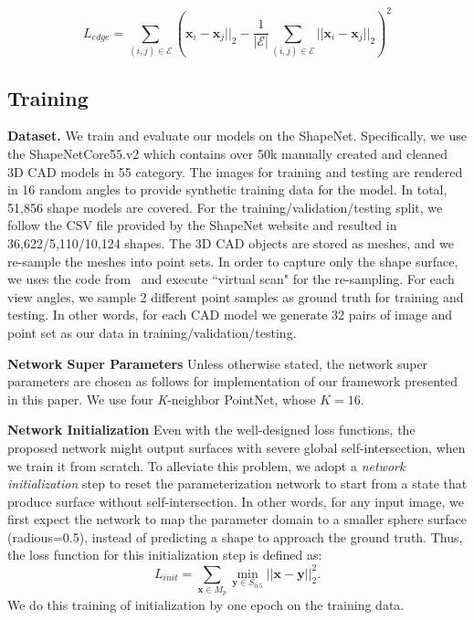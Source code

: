 \begin{equation}
\label{equ:edgereg}
L_{edge} = \sum_{(i,j)\in\mathcal{E}}(\mathbf{x}_i-\mathbf{x}_j||_2 - \frac{1}{|\mathcal{E}|}\sum_{(i,j)\in\mathcal{E} }||\mathbf{x}_i-\mathbf{x}_j||_2)^2
\end{equation}



\subsection{Training} 
\noindent \textbf{Dataset.}
We train and evaluate our models on the ShapeNet\cite{shapenetdata}. Specifically, we use the ShapeNetCore55.v2 which contains over 50k manually created and cleaned 3D CAD models in 55 category.
The images for training and testing are rendered in 16 random angles to provide synthetic training data for the model. 
In total, 51,856 shape models are covered. 
For the training/validation/testing split, we follow the CSV file provided by the ShapeNet website and resulted in 36,622/5,110/10,124 shapes. 
The 3D CAD objects are stored as meshes, and we re-sample the meshes into point sets. 
In order to capture only the shape surface, we uses the code from~\cite{ocnn} and execute ``virtual scan" for the re-sampling.
For each view angles, we sample 2 different point samples as ground truth for training and testing. In other words, for each CAD model we generate 32 pairs of image and point set as our data in training/validation/testing.

\noindent \textbf{Network Super Parameters}
Unless otherwise stated, the network super parameters are chosen as follows for implementation of our framework presented in this paper. We use four \textit{K}-neighbor PointNet, whose $K=16$. 

\noindent \textbf{Network Initialization}
Even with the well-designed loss functions, the proposed network might output surfaces with severe global self-intersection, when we train it from scratch.
%
To alleviate this problem, we adopt a \emph{network initialization} step to reset the parameterization network to start from a state that produce surface without self-intersection. In other words, for any input image, we first expect the network to map the parameter domain to a smaller sphere surface (radious=0.5), instead of predicting a shape to approach the ground truth.
Thus, the loss function for this initialization step is defined as:
\begin{equation}
\label{equ:init}
L_{init} = \sum_{\mathbf{x}\in M_p}\min_{\mathbf{y}\in S_{0.5}}||\mathbf{x} - \mathbf{y}||_2^2.
\end{equation} 
We do this training of initialization by one epoch on the training data. 

